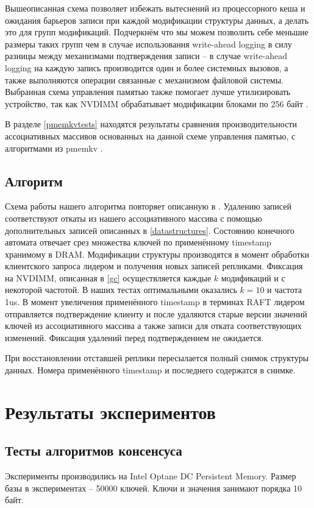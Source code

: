 \documentclass[pdftex,ptm,12pt,a4paper]{report}
\theoremstyle{definition}
\begin{document}
Вышеописанная схема позволяет избежать вытеснений из процессорного кеша и ожидания барьеров записи при каждой модификации структуры данных, а делать это для групп модификаций.
Подчеркнём что мы можем позволить себе меньшие размеры таких групп чем в случае использования write-ahead logging в силу разницы между механизмами подтверждения записи --
в случае write-ahead logging на каждую запись производится один и более системных вызовов, а также выполняются операции связанные с механизмом файловой системы.
Выбранная схема управления памятью также помогает лучше утилизировать устройство, так как NVDIMM обрабатывает модификации блоками по 256 байт \cite{izraelevitz2019basic}.

В разделе \ref{pmemkvtests} находятся результаты сравнения производительности ассоциативных массивов основанных на данной схеме управления памятью, с алгоритмами из pmemkv \cite{pmemkv}.

\section{Алгоритм}
Схема работы нашего алгоритма повторяет описанную в \cite{raftpaper}. Удалению записей соответствуют откаты из нашего ассоциативного массива с помощью дополнительных записей описанных в \ref{datastructures}. Состоянию конечного автомата отвечает срез множества ключей по применённому timestamp хранимому в DRAM. Модификации структуры производятся в момент обработки
клиентского запроса лидером и получения новых записей репликами. Фиксация на NVDIMM, описанная в \ref{gc} осуществляется каждые $k$ модификаций и с некоторой частотой.
В наших тестах оптимальными оказались $k=10$ и частота 1us. В момент увеличения применённого timestamp в терминах RAFT лидером отправляется подтверждение клиенту и после удаляются
старые версии значений ключей из ассоциативного массива а также записи для отката соответствующих изменений. Фиксация удалений перед подтверждением не ожидается.

При восстановлении отставшей реплики пересылается полный снимок структуры данных. Номера применённого timestamp и последнего содержатся в снимке.

\chapter{Результаты экспериментов}
\section{Тесты алгоритмов консенсуса}
Эксперименты производились на Intel Optane DC Persistent Memory.
Размер базы в экспериментах -- 50000 ключей. Ключи и значения занимают порядка 10 байт.
\end{document}
